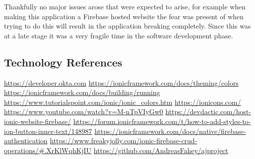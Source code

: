 Thankfully no major issues arose that were expected to arise, for example when making this application a Firebase hosted website the fear was present of when trying to do this will result in the application breaking completely. Since this was at a late stage it was a very fragile time in the software development phase. 

\newpage
\subsection{Technology References}
\url{https://developer.okta.com}
\newline
\url{https://ionicframework.com/docs/theming/colors}
\newline
\url{https://ionicframework.com/docs/building/running}
\newline
\url{https://www.tutorialspoint.com/ionic/ionic_colors.htm}
\newline
\url{https://ionicons.com/}
\newline
\url{https://www.youtube.com/watch?v=M-nTpVIyGw0}
\newline
\url{https://devdactic.com/host-ionic-website-firebase/}
\newline
\url{https://forum.ionicframework.com/t/how-to-add-styles-to-ion-button-inner-text/148987}
\newline
\url{https://ionicframework.com/docs/native/firebase-authentication}
\newline
\url{https://www.freakyjolly.com/ionic-firebase-crud-operations/#.XrKlWqhKjIU}
\newline
\url{https://github.com/AndreasFahey/ajproject}

